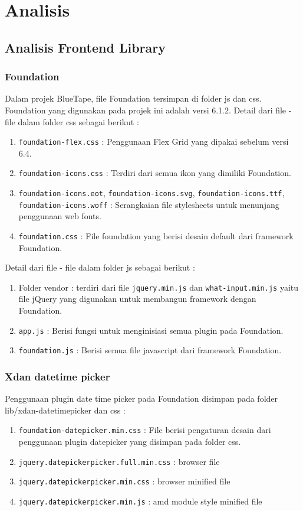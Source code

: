 \chapter{Analisis}


\section{Analisis Frontend Library}
\subsection{Foundation}
Dalam projek BlueTape, file Foundation tersimpan di folder js dan css. Foundation yang digunakan pada projek ini adalah versi 6.1.2. Detail dari file - file dalam folder css sebagai berikut :
\begin{enumerate}		
	\item \verb|foundation-flex.css| : Penggunaan Flex Grid yang dipakai sebelum versi 6.4.
	\item \verb|foundation-icons.css| : Terdiri dari semua ikon yang dimiliki Foundation.
	\item \verb|foundation-icons.eot|, \verb|foundation-icons.svg|, \verb|foundation-icons.ttf|, \verb|foundation-icons.woff| : Serangkaian file stylesheets untuk menunjang penggunaan web fonts.
	\item \verb|foundation.css| : File foundation yang berisi desain default dari framework Foundation. 
\end{enumerate}	
Detail dari file - file dalam folder js sebagai berikut :
\begin{enumerate}
	\item Folder vendor : terdiri dari file \verb|jquery.min.js| dan \verb|what-input.min.js| yaitu file jQuery yang digunakan untuk membangun framework dengan Foundation.
	\item \verb|app.js| : Berisi fungsi untuk menginisiasi semua plugin pada Foundation.
	\item \verb|foundation.js| : Berisi semua file javascript dari framework Foundation.
\end{enumerate}
\subsection{Xdan datetime picker}
Penggunaan plugin date time picker pada Foundation disimpan pada folder lib/xdan-datetimepicker dan css :
\begin{enumerate}
	\item \verb|foundation-datepicker.min.css| : File berisi pengaturan desain dari penggunaan plugin datepicker yang disimpan pada folder css.
	\item \verb|jquery.datepickerpicker.full.min.css| : browser file
	\item \verb|jquery.datepickerpicker.min.css| : browser minified file
	\item \verb|jquery.datepickerpicker.min.js| : amd module style minified file	
\end{enumerate}

